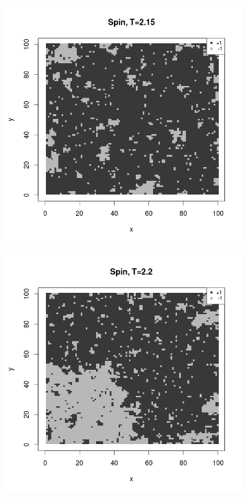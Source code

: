 \documentclass{scrartcl}
\begin{document}
\begin{figure}[ht]
\begin{subfigure}{.35\textwidth}
\end{subfigure}
\begin{subfigure}{.35\textwidth}
  \centering
  \includegraphics[width=1\linewidth]{spins/spinT2_15}
\end{subfigure}%
\begin{subfigure}{.35\textwidth}
  \centering
  \includegraphics[width=1\linewidth]{spins/spinT2_2}

\end{subfigure}
\end{figure}
\end{document}
